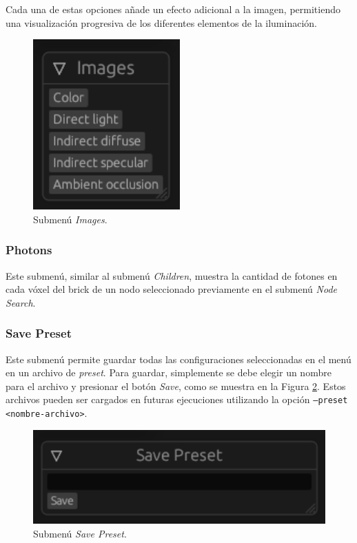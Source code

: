 Cada una de estas opciones añade un efecto adicional a la imagen, permitiendo una visualización progresiva de los diferentes elementos de la iluminación.

\begin{figure}[h]
    \centering
    \includegraphics[width=.5\textwidth]{images.png}
    \caption{Submenú \textit{Images}.}
    \label{fig:images}
\end{figure}

\subsubsection{Photons}

Este submenú, similar al submenú \textit{Children}, muestra la cantidad de fotones en cada vóxel del brick de un nodo seleccionado previamente en el submenú \textit{Node Search}.

\subsubsection{Save Preset}

Este submenú permite guardar todas las configuraciones seleccionadas en el menú en un archivo de \textit{preset}.
Para guardar, simplemente se debe elegir un nombre para el archivo y presionar el botón \textit{Save}, como se muestra en la Figura \ref{fig:save_preset}.
Estos archivos pueden ser cargados en futuras ejecuciones utilizando la opción \texttt{--preset <nombre-archivo>}.

\begin{figure}[h]
    \centering
    \includegraphics[width=.5\textwidth]{save_preset.png}
    \caption{Submenú \textit{Save Preset}.}
    \label{fig:save_preset}
\end{figure}

